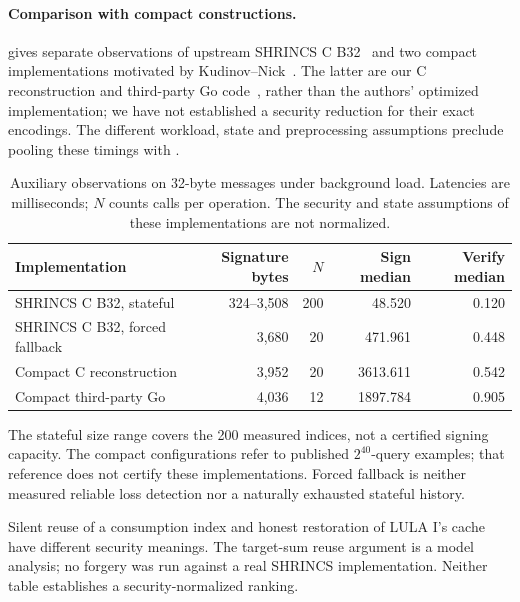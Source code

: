 \paragraph{Comparison with compact constructions.}\label{sec:benchcomparison}
 gives separate observations of upstream SHRINCS C B32~\cite{shrincsc} and two compact implementations motivated by Kudinov--Nick~\cite{kn}. The latter are our C reconstruction and third-party Go code~\cite{hashsiggo}, rather than the authors' optimized implementation; we have not established a security reduction for their exact encodings. The different workload, state and preprocessing assumptions preclude pooling these timings with .

\begin{table}[t]
\caption{Auxiliary observations on 32-byte messages under background load. Latencies are milliseconds; $N$ counts calls per operation. The security and state assumptions of these implementations are not normalized.}\label{tab:eval-aux}
\centering\small\setlength{\tabcolsep}{3pt}
\begin{tabular}{lrrrr}\toprule
Implementation & Signature bytes & $N$ & Sign median & Verify median\\\midrule
SHRINCS C B32, stateful &324--3,508&200&48.520&0.120\\
SHRINCS C B32, forced fallback &3,680&20&471.961&0.448\\
Compact C reconstruction &3,952&20&3613.611&0.542\\
Compact third-party Go &4,036&12&1897.784&0.905\\\bottomrule
\end{tabular}
\smallskip\par\raggedright\footnotesize The stateful size range covers the 200 measured indices, not a certified signing capacity. The compact configurations refer to published $2^{40}$-query examples; that reference does not certify these implementations. Forced fallback is neither measured reliable loss detection nor a naturally exhausted stateful history.
\end{table}

Silent reuse of a consumption index and honest restoration of LULA I's cache have different security meanings. The target-sum reuse argument is a model analysis; no forgery was run against a real SHRINCS implementation. Neither table establishes a security-normalized ranking.
